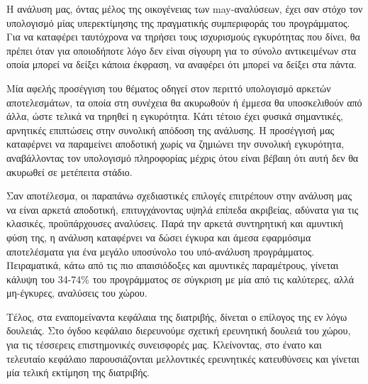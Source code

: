 Η ανάλυση μας, όντας μέλος της οικογένειας των {\en may}-αναλύσεων, έχει σαν στόχο τον υπολογισμό μίας υπερεκτίμησης της πραγματικής συμπεριφοράς του προγράμματος. Για να καταφέρει ταυτόχρονα να τηρήσει τους ισχυρισμούς εγκυρότητας που δίνει, θα πρέπει όταν για οποιοδήποτε λόγο δεν είναι σίγουρη για το σύνολο αντικειμένων στα οποία μπορεί να δείξει κάποια έκφραση, να αναφέρει ότι μπορεί να δείξει στα πάντα.

Μία αφελής προσέγγιση του θέματος οδηγεί στον περιττό υπολογισμό αρκετών αποτελεσμάτων, τα οποία στη συνέχεια θα ακυρωθούν ή έμμεσα θα υποσκελιθούν από άλλα, ώστε τελικά να τηρηθεί η εγκυρότητα. Κάτι τέτοιο έχει φυσικά σημαντικές, αρνητικές επιπτώσεις στην \mbox{συνολική} απόδοση της ανάλυσης. Η προσέγγισή μας καταφέρνει να παραμείνει αποδοτική χωρίς να ζημιώνει την συνολική εγκυρότητα, αναβάλλοντας τον υπολογισμό πληροφορίας μέχρις ότου είναι βέβαιη ότι αυτή δεν θα ακυρωθεί σε μετέπειτα στάδιο.

Σαν αποτέλεσμα, οι παραπάνω σχεδιαστικές επιλογές επιτρέπουν στην ανάλυση μας να είναι αρκετά αποδοτική, επιτυγχάνοντας υψηλά επίπεδα ακριβείας, αδύνατα για τις κλασικές, προϋπάρχουσες αναλύσεις. Παρά την αρκετά συντηρητική και αμυντική φύση της, η ανάλυση καταφέρνει να δώσει έγκυρα και άμεσα εφαρμόσιμα αποτελέσματα για ένα μεγάλο υποσύνολο του υπό-ανάλυση προγράμματος. Πειραματικά, κάτω από τις πιο απαισιόδοξες και αμυντικές παραμέτρους, γίνεται κάλυψη του 34-74\% του προγράμματος σε σύγκριση με μία από τις καλύτερες, αλλά μη-έγκυρες, αναλύσεις του χώρου.


\vspace{5 mm}
Τέλος, στα εναπομείναντα κεφάλαια της διατριβής, δίνεται ο επίλογος της εν λόγω δουλειάς. Στο όγδοο κεφάλαιο διερευνούμε σχετική ερευνητική δουλειά του χώρου, για τις τέσσερεις επιστημονικές συνεισφορές μας. Κλείνοντας, στο ένατο και τελευταίο κεφάλαιο παρουσιάζονται μελλοντικές ερευνητικές κατευθύνσεις και γίνεται μία τελική εκτίμηση της διατριβής.